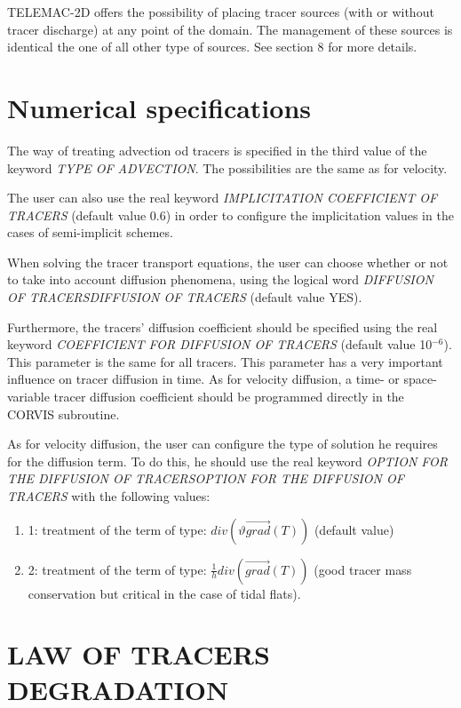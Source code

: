  TELEMAC-2D offers the possibility of placing tracer sources (with or without tracer discharge) at any point of the domain. The management of these sources is identical the one of all other type of sources. See section 8 for more details.


\section{ Numerical specifications}

 The way of treating advection od tracers is specified in the third value of the keyword \textit{TYPE OF ADVECTION}. The possibilities are the same as for velocity.

 The user can also use the real keyword \textit{IMPLICITATION COEFFICIENT OF TRACERS} (default value 0.6) in order to configure the implicitation values in the cases of semi-implicit schemes.

 When solving the tracer transport equations, the user can choose whether or not to take into account diffusion phenomena, using the logical word \textit{DIFFUSION OF TRACERSDIFFUSION OF TRACERS} (default value YES).

 Furthermore, the tracers' diffusion coefficient should be specified using the real keyword \textit{COEFFICIENT FOR DIFFUSION OF TRACERS} (default value 10${}^{-6}$). This parameter is the same for all tracers. This parameter has a very important influence on tracer diffusion in time. As for velocity diffusion, a time- or space-variable tracer diffusion coefficient should be programmed directly in the CORVIS subroutine.

 As for velocity diffusion, the user can configure the type of solution he requires for the diffusion term. To do this, he should use the real keyword \textit{OPTION FOR THE DIFFUSION OF TRACERSOPTION FOR THE DIFFUSION OF TRACERS} with the following values:

\begin{enumerate}
\item[\nonumber]  1: treatment of the term of type: $div\left(\vartheta \overrightarrow{grad}\left(T\right)\right)$ (default value)

\item[\nonumber]  2: treatment of the term of type: $\frac{1}{h}div\left(\overrightarrow{grad}\left(T\right)\right)$ (good tracer mass conservation but critical in the case of tidal flats).
\end{enumerate}


\section{ LAW OF TRACERS DEGRADATION}

